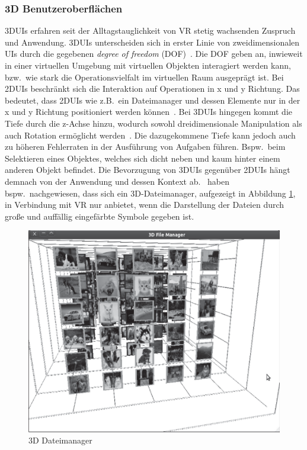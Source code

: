 \subsubsection{3D Benutzeroberflächen}
3DUIs erfahren seit der Alltagstauglichkeit von VR stetig wachsenden Zuspruch und Anwendung. 3DUIs unterscheiden sich in erster Linie von zweidimensionalen UIs durch die gegebenen \textit{degree of freedom} (DOF)~\cite{whatuserinterfacetouse,asurveyon3dobjectmanipulation,theoryandpracticebook}. Die DOF geben an, inwieweit in einer virtuellen Umgebung mit virtuellen Objekten interagiert werden kann, bzw.~wie stark die Operationsvielfalt im virtuellen Raum ausgeprägt ist. Bei 2DUIs beschränkt sich die Interaktion auf Operationen in x und y Richtung. Das bedeutet, dass 2DUIs wie z.B.~ein Dateimanager und dessen Elemente nur in der x und y Richtung positioniert werden können~\cite{issuesandbenefitsofusing3d}. Bei 3DUIs hingegen kommt die Tiefe durch die z-Achse hinzu, wodurch sowohl dreidimensionale Manipulation als auch Rotation ermöglicht werden~\cite{anintroductionto3dspacial}. Die dazugekommene Tiefe kann jedoch auch zu höheren Fehlerraten in der Ausführung von Aufgaben führen. Bspw.~beim Selektieren eines Objektes, welches sich dicht neben und kaum hinter einem anderen Objekt befindet. Die Bevorzugung von 3DUIs gegenüber 2DUIs hängt demnach von der Anwendung und dessen Kontext ab.~\cite{issuesandbenefitsofusing3d} haben bspw.~nachgewiesen, dass sich ein 3D-Dateimanager, aufgezeigt in Abbildung \ref{fig:3dinterface}, in Verbindung mit VR nur anbietet, wenn die Darstellung der Dateien durch große und auffällig eingefärbte Symbole gegeben ist.

\begin{figure}[h]
\captionsetup{width=.7\linewidth}
\includegraphics[scale=0.75]{Bilder/Hauptteil/3duserinterface}
\centering
\caption{3D Dateimanager~\cite[p.~243]{issuesandbenefitsofusing3d}}
\label{fig:3dinterface}
\end{figure}

